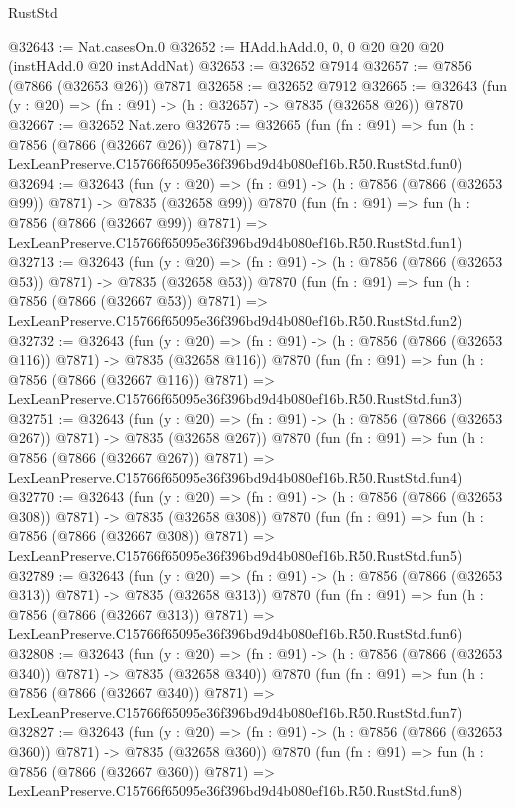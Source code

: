 \begin{lexlean}{RustStd}
\begin{coremodule}
@32643 := Nat.casesOn.{0}
@32652 := HAdd.hAdd.{0, 0, 0} @20 @20 @20 (instHAdd.{0} @20 instAddNat)
@32653 := @32652 @7914
@32657 := @7856 (@7866 (@32653 @26)) @7871
@32658 := @32652 @7912
@32665 := @32643 (fun (y : @20) => (fn : @91) -> (h : @32657) -> @7835 (@32658 @26)) @7870
@32667 := @32652 Nat.zero
@32675 := @32665
    (fun (fn : @91) =>
    fun (h : @7856 (@7866 (@32667 @26)) @7871) =>
    LexLeanPreserve.C15766f65095e36f396bd9d4b080ef16b.R50.RustStd.fun0)
@32694 := @32643
    (fun (y : @20) => (fn : @91) -> (h : @7856 (@7866 (@32653 @99)) @7871) -> @7835 (@32658 @99))
    @7870
    (fun (fn : @91) =>
    fun (h : @7856 (@7866 (@32667 @99)) @7871) =>
    LexLeanPreserve.C15766f65095e36f396bd9d4b080ef16b.R50.RustStd.fun1)
@32713 := @32643
    (fun (y : @20) => (fn : @91) -> (h : @7856 (@7866 (@32653 @53)) @7871) -> @7835 (@32658 @53))
    @7870
    (fun (fn : @91) =>
    fun (h : @7856 (@7866 (@32667 @53)) @7871) =>
    LexLeanPreserve.C15766f65095e36f396bd9d4b080ef16b.R50.RustStd.fun2)
@32732 := @32643
    (fun (y : @20) => (fn : @91) -> (h : @7856 (@7866 (@32653 @116)) @7871) -> @7835 (@32658 @116))
    @7870
    (fun (fn : @91) =>
    fun (h : @7856 (@7866 (@32667 @116)) @7871) =>
    LexLeanPreserve.C15766f65095e36f396bd9d4b080ef16b.R50.RustStd.fun3)
@32751 := @32643
    (fun (y : @20) => (fn : @91) -> (h : @7856 (@7866 (@32653 @267)) @7871) -> @7835 (@32658 @267))
    @7870
    (fun (fn : @91) =>
    fun (h : @7856 (@7866 (@32667 @267)) @7871) =>
    LexLeanPreserve.C15766f65095e36f396bd9d4b080ef16b.R50.RustStd.fun4)
@32770 := @32643
    (fun (y : @20) => (fn : @91) -> (h : @7856 (@7866 (@32653 @308)) @7871) -> @7835 (@32658 @308))
    @7870
    (fun (fn : @91) =>
    fun (h : @7856 (@7866 (@32667 @308)) @7871) =>
    LexLeanPreserve.C15766f65095e36f396bd9d4b080ef16b.R50.RustStd.fun5)
@32789 := @32643
    (fun (y : @20) => (fn : @91) -> (h : @7856 (@7866 (@32653 @313)) @7871) -> @7835 (@32658 @313))
    @7870
    (fun (fn : @91) =>
    fun (h : @7856 (@7866 (@32667 @313)) @7871) =>
    LexLeanPreserve.C15766f65095e36f396bd9d4b080ef16b.R50.RustStd.fun6)
@32808 := @32643
    (fun (y : @20) => (fn : @91) -> (h : @7856 (@7866 (@32653 @340)) @7871) -> @7835 (@32658 @340))
    @7870
    (fun (fn : @91) =>
    fun (h : @7856 (@7866 (@32667 @340)) @7871) =>
    LexLeanPreserve.C15766f65095e36f396bd9d4b080ef16b.R50.RustStd.fun7)
@32827 := @32643
    (fun (y : @20) => (fn : @91) -> (h : @7856 (@7866 (@32653 @360)) @7871) -> @7835 (@32658 @360))
    @7870
    (fun (fn : @91) =>
    fun (h : @7856 (@7866 (@32667 @360)) @7871) =>
    LexLeanPreserve.C15766f65095e36f396bd9d4b080ef16b.R50.RustStd.fun8)

\end{coremodule}
\end{lexlean}
